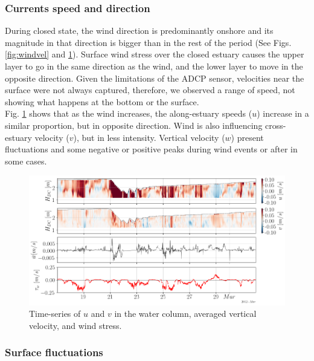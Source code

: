 \documentclass[tesis.tex]{subfiles}
\begin{document}
\subsubsection{Currents speed and direction}

During closed state, the wind direction is predominantly onshore and its magnitude in that direction is bigger than in the rest of the period (See Figs. \ref{fig:windvel} and \ref{fig:vels}). Surface wind stress over the closed estuary causes the upper layer to go in the same direction as the wind, and the lower layer to move in the opposite direction. Given the limitations of the ADCP sensor, velocities near the surface were not always captured, therefore, we observed a range of speed, not showing what happens at the bottom or the surface. \\

Fig. \ref{fig:vels} shows that as the wind increases, the along-estuary speeds ($u$) increase in a similar proportion, but in opposite direction. Wind is also influencing cross-estuary velocity ($v$), but in less intensity. Vertical velocity ($w$) present fluctuations and some negative or positive peaks during wind events or after in some cases. 


\begin{figure}[h!]
    \centering
    \includegraphics[width=\textwidth]{Imagenes/vels.png}
    \caption{Time-series of $u$ and $v$ in the water column, averaged vertical velocity, and wind stress.}
    \label{fig:vels}
\end{figure}

\subsubsection{Surface fluctuations}
\end{document}
